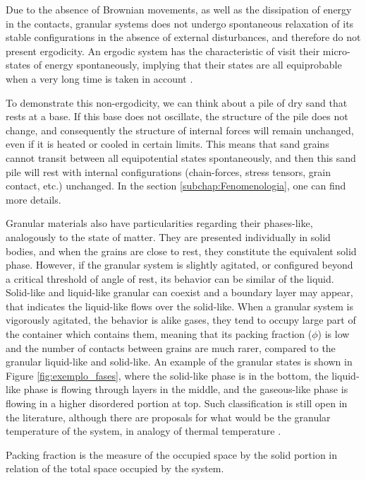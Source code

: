     Due to the absence of Brownian movements, as well as the dissipation of energy in the contacts, granular systems does not undergo spontaneous relaxation of its stable configurations in the absence of external disturbances, and therefore do not present ergodicity. An ergodic system has the characteristic of visit their micro-states of energy spontaneously, implying that their states are all equiprobable when a very long time is taken in account \cite{Unifying_Concepts_in_Granular_Media_and_Glasses, Srdjan-Tese}.

    To demonstrate this non-ergodicity, we can think about a pile of dry sand that rests at a base. If this base does not oscillate, the structure of the pile does not change, and consequently the structure of internal forces will remain unchanged, even if it is heated or cooled in certain limits. This means that sand grains cannot transit between all equipotential states spontaneously, and then this sand pile will rest with internal configurations (chain-forces, stress tensors, grain contact, etc.) unchanged. In the section \ref{subchap:Fenomenologia}, one can find more details.

    Granular materials also have particularities regarding their phases-like, analogously to the state of matter. They are presented individually in solid bodies, and when the grains are close to rest, they constitute the equivalent solid phase. However, if the granular system is slightly agitated, or configured beyond a critical threshold of angle of rest, its behavior can be similar of the liquid. Solid-like and liquid-like granular can coexist and a boundary layer may appear, that indicates the liquid-like flows over the solid-like. When a granular system is vigorously agitated, the behavior is alike gases, they tend to occupy large part of the container which contains them, meaning that its packing fraction ($\phi$) is low and the number of contacts between grains are much rarer, compared to the granular liquid-like and solid-like. An example of the granular states is shown in Figure \ref{fig:exemplo_fases}, where the solid-like phase is in the bottom, the liquid-like phase is flowing through layers in the middle, and the gaseous-like phase is flowing in a higher disordered portion at top. Such classification is still open in the literature, although there are proposals for what would be the granular temperature of the system, in analogy of thermal temperature \cite{Granular_Solids_Liquids_and_Gases}.

    Packing fraction is the measure of the occupied space by the solid portion in relation of the total space occupied by the system. 

